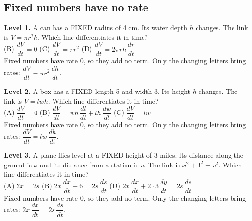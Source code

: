 \documentclass[11pt]{article}
\begin{document}
\subsection*{Fixed numbers have no rate}
\noindent\textbf{Level 1.} A can has a FIXED radius of 4 cm. Its water depth $h$ changes. The link is $V=\pi r^2h$. Which line differentiates it in time?\\  \quad (B) $\dfrac{dV}{dt}=0$ \quad (C) $\dfrac{dV}{dt}=\pi r^2$ \quad (D) $\dfrac{dV}{dt}=2\pi rh\,\dfrac{dr}{dt}$\\  \quad Fixed numbers have rate 0, so they add no term. Only the changing letters bring rates: $\dfrac{dV}{dt}=\pi r^2\,\dfrac{dh}{dt}$.\par\medskip
\noindent\textbf{Level 2.} A box has a FIXED length 5 and width 3. Its height $h$ changes. The link is $V=lwh$. Which line differentiates it in time?\\ (A) $\dfrac{dV}{dt}=0$ \quad (B) $\dfrac{dV}{dt}=w h\,\dfrac{dl}{dt}+l h\,\dfrac{dw}{dt}$ \quad (C) $\dfrac{dV}{dt}=lw$ \quad {}\\  \quad Fixed numbers have rate 0, so they add no term. Only the changing letters bring rates: $\dfrac{dV}{dt}=lw\,\dfrac{dh}{dt}$.\par\medskip
\noindent\textbf{Level 3.} A plane flies level at a FIXED height of 3 miles. Its distance along the ground is $x$ and its distance from a station is $s$. The link is $x^2+3^2=s^2$. Which line differentiates it in time?\\ (A) $2x=2s$ \quad (B) $2x\,\dfrac{dx}{dt}+6=2s\,\dfrac{ds}{dt}$ \quad {} \quad (D) $2x\,\dfrac{dx}{dt}+2\cdot3\,\dfrac{dy}{dt}=2s\,\dfrac{ds}{dt}$\\  \quad Fixed numbers have rate 0, so they add no term. Only the changing letters bring rates: $2x\,\dfrac{dx}{dt}=2s\,\dfrac{ds}{dt}$.\par\medskip
\end{document}
